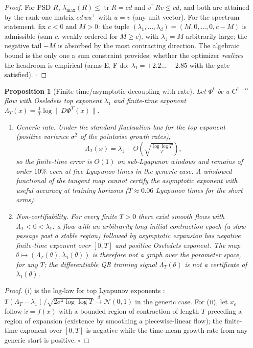 \documentclass[11pt]{article}
\newcommand{\tr}{\operatorname{tr}}
\newtheorem{proposition}{Proposition}
\begin{document}
\begin{proof}
For PSD $R$, $\lambda_{\max}(R)\le\tr R=cd$ and $v^\top Rv\le cd$, and
both are attained by the rank-one matrix $cd\,uu^\top$ with $u=v$ (any
unit vector). For the spectrum statement, fix $c<0$ and $M>0$: the
tuple $(\lambda_1,\ldots,\lambda_d)=(M,0,\ldots,0,c-M)$ is admissible
(sum $c$, weakly ordered for $M\ge c$), with $\lambda_1=M$ arbitrarily
large; the negative tail $-M$ is absorbed by the most contracting
direction. The algebraic bound is the only one a sum constraint
provides; whether the optimizer \emph{realizes} the headroom is
empirical (arms E, F do: $\lambda_1=+2.2\ldots+2.85$ with the gate
satisfied). $\square$
\end{proof}

\begin{proposition}[Finite-time/asymptotic decoupling with rate]
\label{prop:finite}
Let $\Phi^t$ be a $C^{1+\alpha}$ flow with Oseledets top exponent
$\lambda_1$ and finite-time exponent
$\Lambda_T(x)=\frac{1}{T}\log\|D\Phi^T(x)\|$.
\begin{enumerate}
\item[(i)] \emph{Generic rate.} Under the standard fluctuation law for
the top exponent (positive variance $\sigma^2$ of the pointwise growth
rates),
\begin{equation}
  \Lambda_T(x)=\lambda_1+O\!\left(\sqrt{\tfrac{\log\log T}{T}}\right),
\end{equation}
so the finite-time error is $O(1)$ on sub-Lyapunov windows and remains
of order $10\%$ even at five Lyapunov times in the generic case. A
windowed functional of the tangent map cannot certify the asymptotic
exponent with useful accuracy at training horizons ($T\approx0.06$
Lyapunov times for the short arms).
\item[(ii)] \emph{Non-certifiability.} For every finite $T>0$ there
exist smooth flows with $\Lambda_T<0<\lambda_1$: a flow with an
arbitrarily long initial contraction epoch (a slow passage past a
stable region) followed by asymptotic expansion has negative
finite-time exponent over $[0,T]$ and positive Oseledets exponent. The
map $\theta\mapsto(\Lambda_T(\theta),\lambda_1(\theta))$ is therefore
not a graph over the parameter space, for any $T$; the differentiable
QR training signal $\Lambda_T(\theta)$ is not a certificate of
$\lambda_1(\theta)$.
\end{enumerate}
\end{proposition}

\begin{proof}
(i) is the log-law for top Lyapunov exponents
\cite{barreira2002lyapunov}: $T(\Lambda_T-\lambda_1)/\sqrt{2\sigma^2\log\log T}
\xrightarrow{d}\mathcal{N}(0,1)$ in the generic case. For (ii), let
$x_\varepsilon$ follow $\dot x=f(x)$ with a bounded region of
contraction of length $T$ preceding a region of expansion (existence by
smoothing a piecewise-linear flow); the finite-time exponent over
$[0,T]$ is negative while the time-mean growth rate from any generic
start is positive. $\square$
\end{proof}
\end{document}
